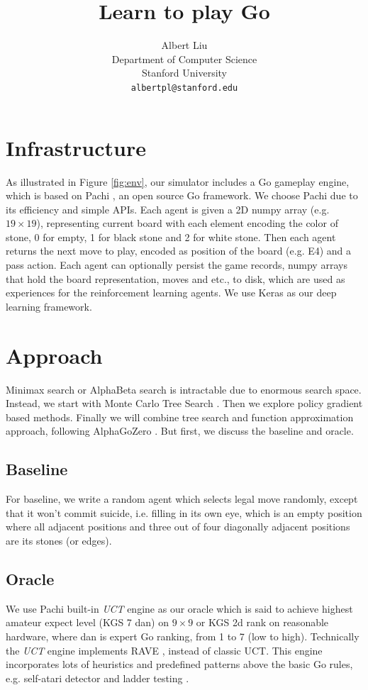 \documentclass{article}
\title{Learn to play Go}
\author{%
  Albert Liu \\
  Department of Computer Science\\
  Stanford University\\
  \texttt{albertpl@stanford.edu} \\
}
\begin{document}
\maketitle

\section{Infrastructure}
As illustrated in Figure \ref{fig:env}, our simulator includes a Go gameplay engine, which is based on Pachi \cite{baudivs2011pachi}, an open source Go framework. We choose Pachi due to its efficiency and simple APIs. Each agent is given a 2D numpy array (e.g. $19 \times 19$), representing current board with each element encoding the color of stone, 0 for empty, 1 for black stone and 2 for white stone. Then each agent returns the next move to play, encoded as position of the board (e.g. E4) and a pass action. 
Each agent can optionally persist the game records, numpy arrays that hold the board representation, moves and etc., to disk, which are used as experiences for the reinforcement learning agents. We use Keras as our deep learning framework. 

\section{Approach}
Minimax search or AlphaBeta search is intractable due to enormous search space. Instead,  we start with Monte Carlo Tree Search \cite{coulom2006efficient}. Then we explore policy gradient based methods. Finally we will combine tree search and function approximation approach, following AlphaGoZero \cite{silver2017masteringalphagozero}.  But first, we discuss the baseline and oracle.

\subsection{Baseline}
For baseline, we write a random agent which selects legal move randomly, except that it won't commit suicide, i.e. filling in its own eye, which is an empty position where all adjacent positions and three out of four diagonally adjacent positions are its stones (or edges).

\subsection{Oracle}
We use Pachi built-in \textit{UCT} engine as our oracle which is said to achieve highest amateur expect level (KGS 7 dan) on $9 \times 9$ or KGS 2d rank on reasonable hardware, where dan is expert Go ranking, from 1 to 7 (low to high). Technically the \textit{UCT} engine implements RAVE \cite{gelly2007combining}, instead of classic UCT. This engine incorporates lots of heuristics and predefined patterns above the basic Go rules, e.g. self-atari detector and ladder testing \cite{gelly2007combining}.
\end{document}
